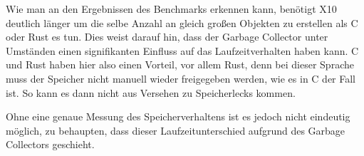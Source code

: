 Wie man an den Ergebnissen des Benchmarks erkennen kann, benötigt X10 deutlich länger um die selbe Anzahl an gleich großen
Objekten zu erstellen als C oder Rust es tun. Dies weist darauf hin, dass der Garbage Collector unter Umständen einen signifikanten
Einfluss auf das Laufzeitverhalten haben kann. C und Rust haben hier also einen Vorteil, vor allem Rust, denn
bei dieser Sprache muss der Speicher nicht manuell wieder freigegeben werden, wie es in C der Fall ist. So kann
es dann nicht aus Versehen zu Speicherlecks kommen.

Ohne eine genaue Messung des Speicherverhaltens ist es jedoch nicht eindeutig möglich, zu behaupten, dass dieser
Laufzeitunterschied aufgrund des Garbage Collectors geschieht.









